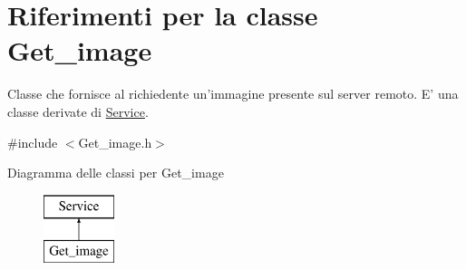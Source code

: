 \hypertarget{class_get__image}{\section{Riferimenti per la classe Get\-\_\-image}
\label{class_get__image}
}


Classe che fornisce al richiedente un'immagine presente sul server remoto. E' una classe derivate di {\ttfamily \hyperlink{class_service}{Service}}.  




{\ttfamily \#include $<$Get\-\_\-image.\-h$>$}

Diagramma delle classi per Get\-\_\-image\begin{figure}[H]
\begin{center}
\leavevmode
\includegraphics[height=2.000000cm]{class_get__image}
\end{center}
\end{figure}
